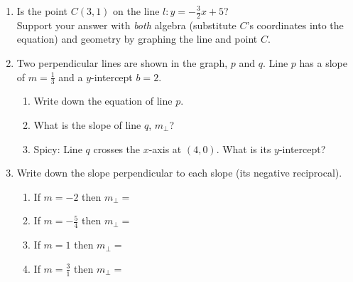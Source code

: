 \begin{enumerate}
\item Is the point $C(3,1)$ on the line $l: y=-\frac{3}{2}x+5$? \\[0.5cm]
Support your answer with \emph{both} algebra (substitute $C$'s coordinates into the equation) and geometry by graphing the line and point $C$.
  \begin{flushright}
  \end{flushright}

\item Two perpendicular lines are shown in the graph, $p$ and $q$. Line $p$ has a slope of $\displaystyle m = \frac{1}{3}$ and a $y$-intercept $b=2$.
\begin{multicols}{2}
    \begin{enumerate}[itemsep=1cm]
      \item Write down the equation of line $p$.
      \item What is the slope of line $q$, $m_\perp$?
      \item Spicy: Line $q$ crosses the $x$-axis at $(4,0)$. What is its $y$-intercept?
      \end{enumerate}
    \begin{flushright}
    \end{flushright}
\end{multicols}

\item Write down the slope perpendicular to each slope (its negative reciprocal).
\begin{enumerate}[itemsep=0.9cm]
  \item If $m = -2$ then $m_{\perp}=$
  \item If $\displaystyle m = -\frac{5}{4}$ then $m_{\perp}=$
  \item If $m = 1$ then $m_{\perp}=$
  \item If $\displaystyle m = \frac{3}{1}$ then $m_{\perp}=$
\end{enumerate}


\end{enumerate}
